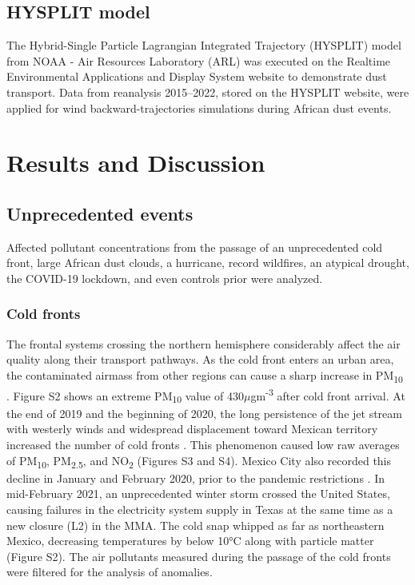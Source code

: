 \documentclass[preprint,12pt]{elsarticle}
\begin{document}
\subsection{HYSPLIT model}
The Hybrid-Single Particle Lagrangian Integrated Trajectory (HYSPLIT) model from NOAA - Air Resources Laboratory (ARL) \citep{Stein_2015} was executed on the Realtime Environmental Applications and Display System website to demonstrate dust transport. Data from reanalysis 2015–2022, stored on the HYSPLIT website, were applied for wind backward-trajectories simulations during African dust events.
\section{Results and Discussion}
\subsection{Unprecedented events}
Affected pollutant concentrations from the passage of an unprecedented cold front, large African dust clouds, a hurricane, record wildfires, an atypical drought, the COVID-19 lockdown, and even controls prior were analyzed.
\subsubsection{Cold fronts}
The frontal systems crossing the northern hemisphere considerably affect the air quality along their transport pathways. As the cold front enters an urban area, the contaminated airmass from other regions can cause a sharp increase in PM\textsubscript{10} \citep{Kang_2019}. Figure S2 shows an extreme PM\textsubscript{10} value of 430$\mu$gm\textsuperscript{-3} after cold front arrival. At the end of 2019 and the beginning of 2020, the long persistence of the jet stream with westerly winds and widespread displacement toward Mexican territory increased the number of cold fronts \citep{yucatn}. This phenomenon caused low raw averages of PM\textsubscript{10}, PM\textsubscript{2.5}, and NO\textsubscript{2} (Figures S3 and S4). Mexico City also recorded this decline in January and February 2020, prior to the pandemic restrictions \citep{Vega_2021}. In mid-February 2021, an unprecedented winter storm crossed the United States, causing failures in the electricity system supply in Texas \citep{Doss_Gollin_2021,years} at the same time as a new closure (L2) in the MMA. The cold snap whipped as far as northeastern Mexico, decreasing temperatures by below 10°C along with particle matter (Figure S2). The air pollutants measured during the passage of the cold fronts were filtered for the analysis of anomalies.
\end{document}
